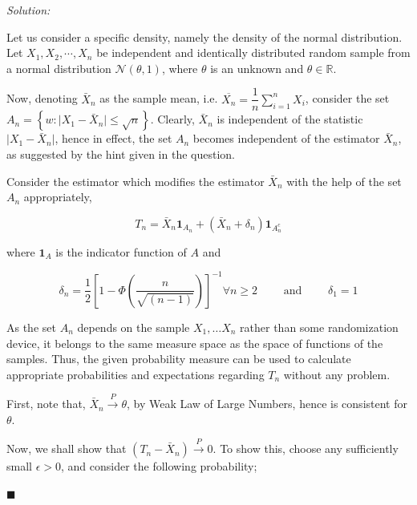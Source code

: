 \documentclass[12pt]{article}
\newcommand{\R}{\mathbb{R}}
\newcommand{\normal}{\mathcal{N}}
\theoremstyle{definition}
\newenvironment{answer}{\textit{Solution: }\quad }{ \hfill $\blacksquare$}
\numberwithin{equation}{section}
\begin{document}
\begin{answer}

Let us consider a specific density, namely the density of the normal distribution. Let $X_1,X_2,\cdots,X_n$ be independent and identically distributed random sample from a normal distribution $\normal(\theta, 1)$, where $\theta$ is an unknown and $\theta \in \R$. 

Now, denoting $\bar{X}_n$ as the sample mean, i.e. $\overline{X_n} = \dfrac{1}{n} \sum_{i=1}^{n} X_i$, consider the set $A_n = \left\{ w : \vert X_{1} - \bar{X}_n \vert \leq \sqrt{n} \right\}$. Clearly, $\bar{X}_n$ is independent of the statistic $\vert X_{1} - \bar{X}_n \vert$, hence in effect, the set $A_n$ becomes independent of the estimator $\bar{X}_n$, as suggested by the hint given in the question.

Consider the estimator which modifies the estimator $\bar{X}_n$ with the help of the set $A_n$ appropriately,

$$T_n = \bar{X}_n \bm{1}_{A_n} + (\bar{X}_n + \delta_n) \bm{1}_{A_n^c}$$

where $\bm{1}_A$ is the indicator function of $A$ and 

$$
\delta_n = \dfrac{1}{2}\left[ 1 - \Phi\left( \dfrac{n}{\sqrt{(n-1)}}\right) \right]^{-1} \forall n \geq 2 \qquad \text{ and } \qquad \delta_1 = 1
$$

As the set $A_n$ depends on the sample $X_1, \dots X_n$ rather than some randomization device, it belongs to the same measure space as the space of functions of the samples. Thus, the given probability measure can be used to calculate appropriate probabilities and expectations regarding $T_n$ without any problem. 

First, note that, $\bar{X}_n \xrightarrow{P} \theta$, by Weak Law of Large Numbers, hence is consistent for $\theta$. 


Now, we shall show that $(T_n - \bar{X}_n) \xrightarrow{P} 0$. To show this, choose any sufficiently small $\epsilon > 0$, and consider the following probability;


\end{answer}
\end{document}
